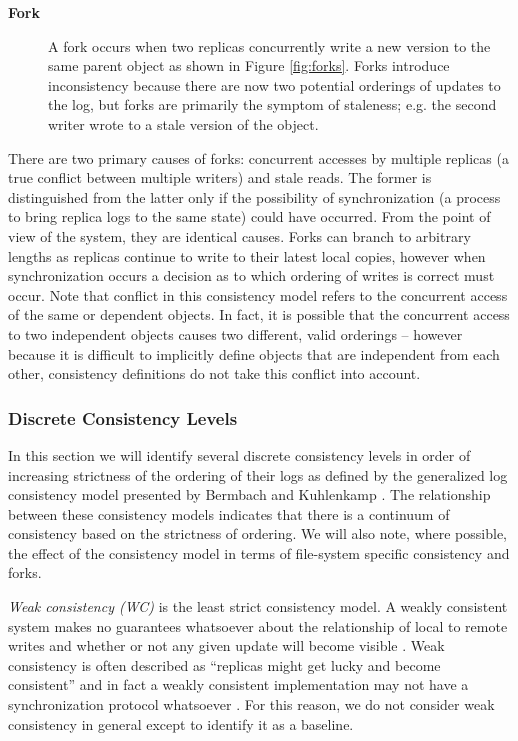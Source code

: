 \documentclass{article}
\begin{document}
\begin{description}
    \item[\textbf{Fork}] A fork occurs when two replicas concurrently write a new version to the same parent object as shown in Figure \ref{fig:forks}. Forks introduce inconsistency because there are now two potential orderings of updates to the log, but forks are primarily the symptom of staleness; e.g. the second writer wrote to a stale version of the object.
\end{description}

There are two primary causes of forks: concurrent accesses by multiple replicas (a true conflict between multiple writers) and stale reads. The former is distinguished from the latter only if the possibility of synchronization (a process to bring replica logs to the same state) could have occurred. From the point of view of the system, they are identical causes. Forks can branch to arbitrary lengths as replicas continue to write to their latest local copies, however when synchronization occurs a decision as to which ordering of writes is correct must occur. Note that conflict in this consistency model refers to the concurrent access of the same or dependent objects. In fact, it is possible that the concurrent access to two independent objects causes two different, valid orderings -- however because it is difficult to implicitly define objects that are independent from each other, consistency definitions do not take this conflict into account.

\subsubsection{Discrete Consistency Levels}
\label{sec:consistency_levels}

In this section we will identify several discrete consistency levels in order of increasing strictness of the ordering of their logs as defined by the generalized log consistency model presented by Bermbach and Kuhlenkamp \cite{bermbach_consistency_2013}. The relationship between these consistency models indicates that there is a continuum of consistency based on the strictness of ordering. We will also note, where possible, the effect of the consistency model in terms of file-system specific consistency and forks.

\textit{Weak consistency (WC)} is the least strict consistency model.
A weakly consistent system makes no guarantees whatsoever about the relationship of local to remote writes and whether or not any given update will become visible \cite{vogels_eventually_2009}. Weak consistency is often described as ``replicas might get lucky and become consistent'' and in fact a weakly consistent implementation may not have a synchronization protocol whatsoever \cite{bermbach_consistency_2013}. For this reason, we do not consider weak consistency in general except to identify it as a baseline.
\end{document}
